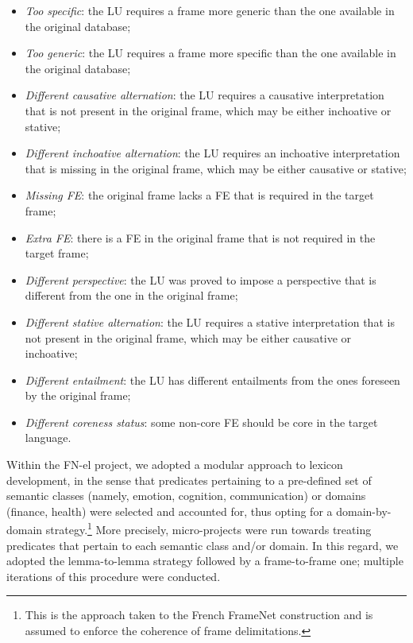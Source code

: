 \documentclass[output=paper,colorlinks,citecolor=brown]{langscibook}
\begin{document}
\begin{itemize}
\item \textit{Too specific}: the LU requires a frame more generic than the one available in the original database;
\item \textit{Too generic}: the LU requires a frame more specific than the one available in the original database;
\item \textit{Different causative alternation}: the LU requires a causative interpretation that is not present in the original frame, which may be either inchoative or stative;
\item \textit{Different inchoative alternation}: the LU requires an inchoative interpretation that is missing in the original frame, which may be either causative or stative;
\item \textit{Missing FE}: the original frame lacks a FE that is required in the target frame;
\item \textit{Extra FE}: there is a FE in the original frame that is not required in the target frame;
\item \textit{Different perspective}: the LU was proved to impose a perspective that is different from the one in the original frame;
\item \textit{Different stative alternation}: the LU requires a stative interpretation that is not present in the original frame, which may be either causative or inchoative;
\item \textit{Different entailment}: the LU has different entailments from the ones foreseen by the original frame;
\item \textit{Different coreness status}: some non-core FE should be core in the target language.
\end{itemize}

Within the FN-el project, we adopted a modular approach to lexicon development, in the sense that predicates pertaining to a pre-defined set of semantic classes (namely, emotion, cognition, communication) or domains (finance, health) were selected and accounted for, thus opting for a domain-by-domain strategy.\footnote{This is the approach taken to the French FrameNet construction \citep{candito_etal_2014} and is assumed to enforce the coherence of frame delimitations.}  More precisely, micro-projects were run towards treating predicates that pertain to each semantic class and/or domain. In this regard, we adopted the lemma-to-lemma strategy followed by a frame-to-frame one; multiple iterations of this procedure were conducted.
\end{document}
